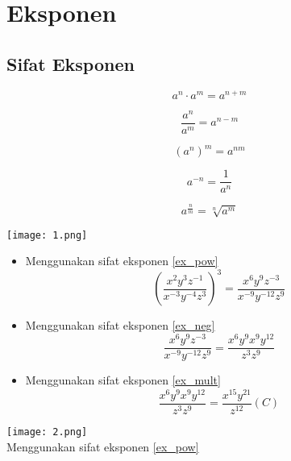 \documentclass{book}
\begin{document}
\chapter*{Eksponen}

\section*{Sifat Eksponen}

\begin{equation}
\label{ex_mult}
a^{n} \cdot a^{m} = a^{n+m} 
\end{equation}

\begin{equation}
\label{ex_div}
\frac{a^{n}}{a^{m}} = a^{n-m} 
\end{equation}

\begin{equation}
\label{ex_pow}
(a^n)^m = a^{nm}
\end{equation}

\begin{equation}
\label{ex_neg}
a^{-n}=\frac{1}{a^n}
\end{equation}

\begin{equation}
\label{ex_frac}
a^{\frac{n}{m}}=\sqrt[n]{a^m}
\end{equation}

\begin{center}
\texttt{[image: 1.png]} \\
\end{center}
\begin{itemize}
\item[]
Menggunakan sifat eksponen \ref{ex_pow}
\[
	\left(\frac{x^{2}y^{3}z^{-1}}{x^{-3}y^{-4}z^{3}}\right)^3 = \frac{x^{6}y^{9}z^{-3}}{x^{-9}y^{-12}z^{9}}
\]
\item[]
Menggunakan sifat eksponen \ref{ex_neg}
\[
	\frac{x^{6}y^{9}z^{-3}}{x^{-9}y^{-12}z^{9}} =
	\frac{x^{6}y^{9}x^{9}y^{12}}{z^{3}z^{9}}
\]
\item[]
Menggunakan sifat eksponen \ref{ex_mult}
\[
	\frac{x^{6}y^{9}x^{9}y^{12}}{z^{3}z^{9}} = 
	\frac{x^{15} y^{21}}{z^{12}} \left(C\right)
\]
\end{itemize}

\texttt{[image: 2.png]} \\
Menggunakan sifat eksponen \ref{ex_pow}
\end{document}
